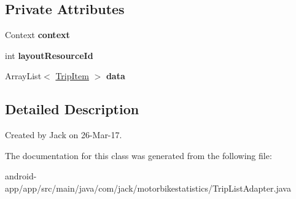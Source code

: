 \subsection*{Private Attributes}
\begin{DoxyCompactItemize}
\item 
\mbox{\label{classcom_1_1jack_1_1motorbikestatistics_1_1_trip_list_adapter_abe987d1818dcbad467b56142acb55447}} 
Context {\bfseries context}
\item 
\mbox{\label{classcom_1_1jack_1_1motorbikestatistics_1_1_trip_list_adapter_a72f8d17ad7f1dc531cbe0015b2f29454}} 
int {\bfseries layout\+Resource\+Id}
\item 
\mbox{\label{classcom_1_1jack_1_1motorbikestatistics_1_1_trip_list_adapter_af0219927cf42917085d1e43abf62374d}} 
Array\+List$<$ \hyperlink{classcom_1_1jack_1_1motorbikestatistics_1_1_trip_item}{Trip\+Item} $>$ {\bfseries data}
\end{DoxyCompactItemize}


\subsection{Detailed Description}
Created by Jack on 26-\/\+Mar-\/17. 

The documentation for this class was generated from the following file\+:\begin{DoxyCompactItemize}
\item 
android-\/app/app/src/main/java/com/jack/motorbikestatistics/Trip\+List\+Adapter.\+java\end{DoxyCompactItemize}

